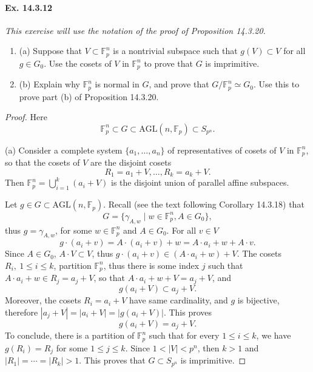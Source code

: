 \documentclass[11pt,a4paper]{article}
\newcommand{\be} {\begin{enumerate}}
\newcommand{\ee} {\end{enumerate}}
\newcommand{\F}{\mathbb{F}}
\begin{document}
  \paragraph{Ex. 14.3.12}{\it This exercise will use the notation of the proof of Proposition 14.3.20.
  \be
  \item[(a)] Suppose that $V \subset \F_p^n$ is a nontrivial subspace such that $g(V) \subset V$ for all $g\in G_0$. Use the cosets of $V$ in $\F_p^n$ to prove that $G$ is imprimitive.
  \item[(b)] Explain why $\F_p^n$ is normal in $G$, and prove that $G/\F_p^n \simeq G_0$. Use this to prove part (b) of Proposition 14.3.20.
  \ee
 }
 \begin{proof}
 Here
 $$\F_p^n \subset G \subset \mathrm{AGL}(n,\F_p) \subset S_{p^n}.$$
 \item[(a)] Consider a complete system $\{a_1,\ldots,a_n\}$ of representatives of cosets of $V$ in $\F_p^n$, so that the cosets of $V$ are the disjoint cosets $$R_1 = a_1+V, \ldots,R_k = a_k + V.$$
 Then $\F_p^n = \bigcup\limits_{i=1}^k (a_i + V)$ is the disjoint union of parallel affine subspaces.
 
 Let $g \in G \subset \mathrm{AGL}(n,\F_p)$. Recall (see the text following Corollary 14.3.18) that
 $$G = \{\gamma_{A,w} \mid w \in \F_p^n, A \in G_0\},$$
 thus $g = \gamma_{A,w}$, for some $w\in \F_p^n$ and $A\in G_0$. For all $v \in V$
 $$g\cdot (a_i + v) = A\cdot (a_i + v) + w =A\cdot a_i + w + A\cdot v.$$
Since $A \in G_0$, $A \cdot V \subset V$, thus $g\cdot (a_i + v) \in (A\cdot a_i + w)+ V.$ The cosets $R_i,\ 1\leq i \leq k$, partition $\F_p^n$, thus there is some index $j$ such that $A\cdot a_i + w \in R_j = a_j + V$, so that $A\cdot a_i + w + V = a_j + V$, and 
 $$g(a_i + V) \subset a_j + V.$$ 
Moreover, the cosets $R_i = a_i +V$ have same cardinality, and $g$ is bijective, therefore $|a_j + V| = |a_i + V| = |g(a_i + V)|$. This proves
  $$g(a_i + V) = a_j + V.$$ 
  To conclude, there is a partition of $\F_p^n$ such that for every $1\leq i \leq k$, we have $g(R_i) = R_j$ for some $1\leq j \leq k$. Since $1<|V|<p^n$, then $k>1$ and $|R_1| =\cdots=|R_k|>1$. This proves that $G\subset S_{p^n}$ is imprimitive.
  

\end{proof}
\end{document}
